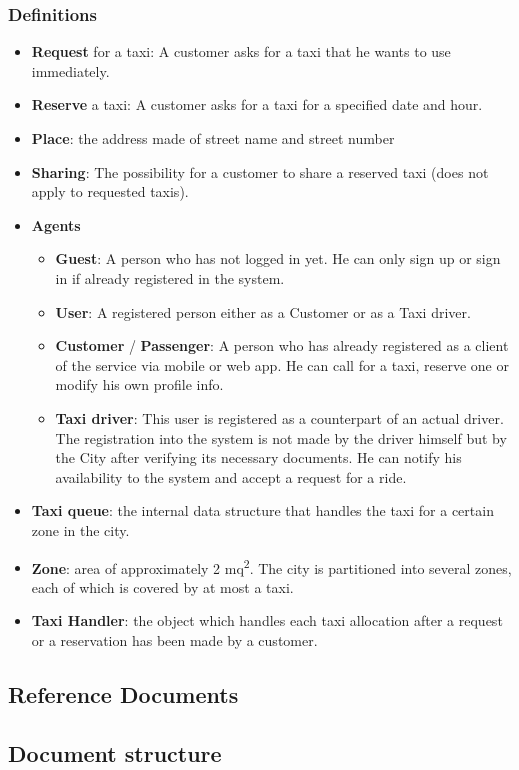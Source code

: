 \subsubsection{Definitions}
	\begin{itemize}
		\item \textbf{Request} for a taxi: A customer asks for a taxi that he wants to use immediately. 
		\item \textbf{Reserve} a taxi: A customer asks for a taxi for a specified date and hour.
		\item \textbf{Place}: the address made of street name and street number
		\item \textbf{Sharing}: The possibility for a customer to share a reserved taxi (does not apply to requested taxis).		
		
		\item \textbf{Agents}
		\begin{itemize}
			\item \textbf{Guest}: A person who has not logged in yet. He can only sign up or sign in if already registered in the system.
			\item \textbf{User}: A registered person either as a Customer or as a Taxi driver.
			\item \textbf{Customer} / \textbf{Passenger}: A person who has already registered as a client of the service via mobile or web app. He can call for a taxi, reserve one or modify his own profile info.
			\item \textbf{Taxi driver}: This user is registered as a counterpart of an actual driver. The registration into the system is not made by the driver himself but by the City after verifying its necessary documents. He can notify his availability to the system and accept a request for a ride.
		\end{itemize}
		
		\item \textbf{Taxi queue}: the internal data structure that handles the taxi for a certain zone in the city.

	
		\item \textbf{Zone}: area of approximately 2 mq\textsuperscript{2}. The city is partitioned into several zones, each of which is covered by at most a taxi.
		
		\item \textbf{Taxi Handler}: the object which handles each taxi allocation after a request or a reservation has been made by a customer.
\end{itemize}

\subsection{Reference Documents}
\subsection{Document structure}
